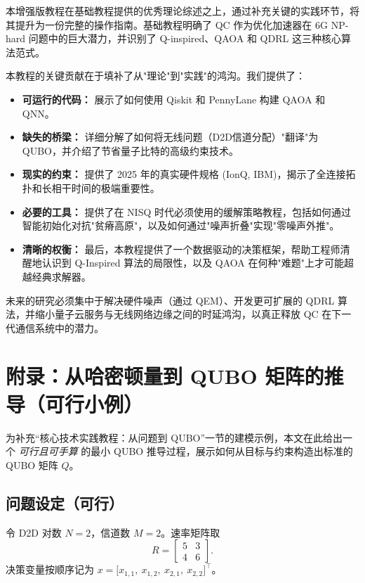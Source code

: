 \documentclass[11pt,a4paper]{article}
\begin{document}
本增强版教程在基础教程提供的优秀理论综述之上，通过补充关键的实践环节，将其提升为一份完整的操作指南。基础教程明确了 QC 作为优化加速器在 6G NP-hard 问题中的巨大潜力，并识别了 Q-inspired、QAOA 和 QDRL 这三种核心算法范式。

本教程的关键贡献在于填补了从"理论"到"实践"的鸿沟。我们提供了：

\begin{itemize}
\item \textbf{可运行的代码：} 展示了如何使用 Qiskit 和 PennyLane 构建 QAOA 和 QNN。
\item \textbf{缺失的桥梁：} 详细分解了如何将无线问题（D2D信道分配）"翻译"为 QUBO，并介绍了节省量子比特的高级约束技术。
\item \textbf{现实的约束：} 提供了 2025 年的真实硬件规格 (IonQ, IBM)，揭示了全连接拓扑和长相干时间的极端重要性。
\item \textbf{必要的工具：} 提供了在 NISQ 时代必须使用的缓解策略教程，包括如何通过智能初始化对抗"贫瘠高原"，以及如何通过"噪声折叠"实现"零噪声外推"。
\item \textbf{清晰的权衡：} 最后，本教程提供了一个数据驱动的决策框架，帮助工程师清醒地认识到 Q-Inspired 算法的局限性，以及 QAOA 在何种"难题"上才可能超越经典求解器。
\end{itemize}

未来的研究必须集中于解决硬件噪声（通过 QEM）、开发更可扩展的 QDRL 算法，并缩小量子云服务与无线网络边缘之间的时延鸿沟，以真正释放 QC 在下一代通信系统中的潜力。

\section*{附录：从哈密顿量到 QUBO 矩阵的推导（可行小例）}

为补充“核心技术实践教程：从问题到 QUBO”一节的建模示例，本文在此给出一个 \emph{可行且可手算} 的最小 QUBO 推导过程，展示如何从目标与约束构造出标准的 QUBO 矩阵 $Q$。

\subsection*{问题设定（可行）}
令 D2D 对数 $N=2$，信道数 $M=2$。速率矩阵取
\[ R=\begin{bmatrix}5 & 3\\ 4 & 6\end{bmatrix}. \]
决策变量按顺序记为 $x=\big[x_{1,1},\ x_{1,2},\ x_{2,1},\ x_{2,2}\big]^\top$。
\end{document}
